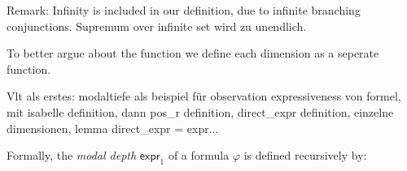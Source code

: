 \begin{isabellebody}
\begin{isamarkuptext}
Remark: Infinity is included in our definition, due to infinite branching conjunctions. Supremum over infinite set wird zu unendlich.%
\end{isamarkuptext}\isamarkuptrue%
%
\begin{isamarkuptext}%
To better argue about the function we define each dimension as a seperate function.%
\end{isamarkuptext}\isamarkuptrue%
%
\begin{isamarkuptext}%
Vlt als erstes: modaltiefe als beispiel für observation expressiveness von formel, mit isabelle definition,
dann pos\_r definition,
direct\_expr definition,
einzelne dimensionen,
lemma direct\_expr = expr...%
\end{isamarkuptext}\isamarkuptrue%
%
\begin{isamarkuptext}%
Formally, the \textit{modal depth} $\textsf{expr}_1$ of a formula $\varphi$ is defined recursively by:


\end{isamarkuptext}
\end{isabellebody}
